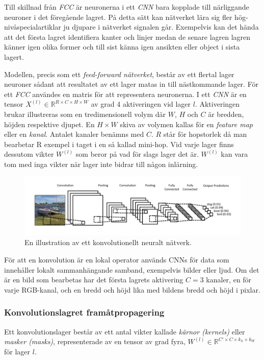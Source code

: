 \documentclass[a4paper,11pt,twoside]{article}
\begin{document}
Till skillnad från \textit{FCC} är neuronerna i ett \textit{CNN} bara kopplade till närliggande neuroner i det föregående lagret. På detta sätt kan nätverket lära sig fler hög-nivåspecialartiklar ju djupare i nätverket signalen går. Exempelvis kan det hända att det första lagret identifiera kanter och linjer medan de senare lagren lagren känner igen olika former och till sist känna igen ansikten eller object i sista lagert. \cite{cs231n}

Modellen, precis som ett \textit{feed-forward nätverket}, består av ett flertal lager neuroner sådant att resultatet av ett lager matas in till nästkommande lager. För ett \textit{FCC} användes en matris för att representera neuronerna. I ett \textit{CNN} är en tensor $X^{(l)} \in \mathbb{R}^{R \times C  \times H \times W}$ av grad 4 aktiveringen vid lager $l$. Aktiveringen brukar illustreras som en tredimensionell volym där $W$, $H$ och $C$ är bredden, höjden respektive djupet. En $H \times W$ skiva av volymen kallas för en \textit{feature map} eller en \textit{kanal}. Antalet kanaler benämns med $C$. $R$ står för hopstorlek då man bearbetar R exempel i taget i en så kallad mini-hop. Vid varje lager finns dessutom vikter $W^{(l)}$  som beror på vad för slags lager det är. $W^{(l)}$ kan vara tom med inga vikter när lager inte bidrar till någon inlärning. \cite{cs231n} \cite{convmath}

\begin{figure}[h]\label{figboatcnn}
	\centering
  		\includegraphics[scale=0.6]{boatcnn.png}
  	\caption{En illustration av ett konvolutionellt neuralt nätverk. \cite{figboatcnn}}
\end{figure}

För att en konvolution är en lokal operator används CNNs för data som innehåller lokalt sammanhängande samband, exempelvis bilder eller ljud. Om det är en bild som bearbetas har det första lagrets aktivering $C = 3$ kanaler, en för varje RGB-kanal, och en bredd och höjd lika med bildens bredd och höjd i pixlar. \cite{cs231n} \cite{convmath}

\subsubsection{Konvolutionslagret framåtpropagering}
Ett konvolutionslager består av ett antal vikter kallade \textit{kärnor (kernels)} eller \textit{masker (masks)}, representerade av en tensor av grad fyra, $W^{(l)} \in \mathbb{R}^{C' \times C  \times k_h \times k_W}$ för lager $l$. \cite{cs231n} \cite{convmath}
\end{document}
